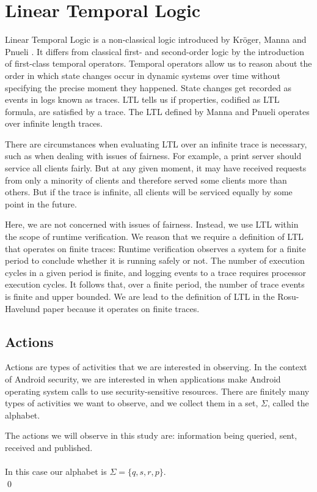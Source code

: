 \chapter{Linear Temporal Logic}
\label{chap:Linear Temporal Logic}

Linear Temporal Logic is a non-classical logic introduced by Kr\"{o}ger, Manna and Pnueli \cite{Pnueli}.  It differs from classical first- and second-order logic by the introduction of first-class temporal operators.  Temporal operators allow us to reason about the order in which state changes occur in dynamic systems over time without specifying the precise moment they happened.  State changes get recorded as events in logs known as traces.  LTL tells us if properties, codified as LTL formula, are satisfied by a trace.  The LTL defined by Manna and Pnueli operates over infinite length traces.

There are circumstances when evaluating LTL over an infinite trace is necessary, such as when dealing with issues of fairness.  For example, a print server should service all clients fairly.  But at any given moment, it may have received requests from only a minority of clients and therefore served some clients more than others.  But if the trace is infinite, all clients will be serviced equally by some point in the future.

Here, we are not concerned with issues of fairness.  Instead, we use LTL within the scope of runtime verification.  We reason that we require a definition of LTL that operates on finite traces:  Runtime verification observes a system for a finite period to conclude whether it is running safely or not.  The number of execution cycles in a given period is finite, and logging events to a trace requires processor execution cycles.  It follows that, over a finite period, the number of trace events is finite and upper bounded.  We are lead to the definition of LTL in the Rosu-Havelund paper \cite{RosuHavelund} because it operates on finite traces.

\section{Actions}
\label{sec: LTL Actions}

\begin{definition}
\label{def: LTLActions}
Actions are types of activities that we are interested in observing.  In the context of Android security, we are interested in when applications make Android operating system calls to use security-sensitive resources.  There are finitely many types of activities we want to observe, and we collect them in a set, $\Sigma$, called the alphabet.

\begin{myEx}
The actions we will observe in this study are: information being queried, sent, received and published.\\
\\
In this case our alphabet is $ \Sigma = \{ q, s, r, p \} $.\\
\qed
\end{myEx}
\end{definition}


